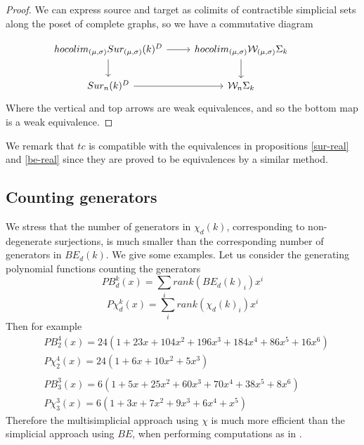 \begin{proof}
We can express source and target as colimits of contractible %
simplicial sets along the poset of complete graphs,
so we have a commutative diagram

	\begin{equation*}
		\begin{tikzcd}
			hocolim_{(\mu,\sigma)}Sur_{(\mu,\sigma)}(k)^{D} \arrow[r] \arrow[d]& hocolim_{(\mu,\sigma)}\mathcal{W}_{(\mu,\sigma)}\Sigma_{k} \arrow[d] \\
			Sur_{n}(k)^{D}\arrow[r] & \mathcal{W}_{n}\Sigma_{k}&
		\end{tikzcd}
	\end{equation*}
	Where the vertical and top arrows
	are weak equivalences, and so the bottom map is a weak equivalence.

\end{proof}
We remark that $tc$ is compatible 
with the equivalences in propositions \ref{sur-real} and \ref{be-real} 
since they are proved to be equivalences by a similar method.





\subsection{Counting  generators}

We stress that the number of generators in $\chi_d(k)$, corresponding to non-degenerate surjections,
is much smaller than the corresponding number of generators in $BE_d(k)$.
We give some examples.
Let us consider the generating polynomial functions counting the generators
$$PB_d^k(x) = \sum_i rank(BE_d(k)_i) x^i $$ $$P\chi_d^k(x)=
\sum_i rank(\chi_d(k)_i) x^i$$
Then for example
\begin{align*}
& PB_2^4(x)=24(1+23x+104x^2+196x^3+184x^4+86x^5+16x^6)\\
& P\chi_2^4(x)=24(1+6x+10x^2+5x^3) \\
& \\
& PB_3^3(x) = 6(1+5x+25x^2+60x^3+70x^4+38x^5+8x^6 ) \\
&  P\chi_3^3(x)= 6(1+3x+7x^2+9x^3+6x^4+x^5)
\end{align*}
Therefore the multisimplicial approach using $\chi$ is much more efficient than the simplicial
approach using $BE$, when performing computations as in \cite{formality}.

